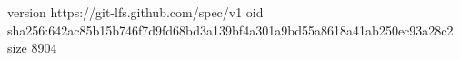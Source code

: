 version https://git-lfs.github.com/spec/v1
oid sha256:642ac85b15b746f7d9fd68bd3a139bf4a301a9bd55a8618a41ab250ec93a28c2
size 8904
